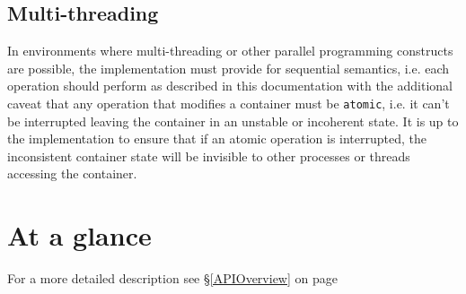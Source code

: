 \documentclass[12pt,a4paper,openany]{memoir} %
\newcommand{\See}[1]{%
see \S\ref{#1} on page~\pageref{#1}
}
\newlength{\yellownotewidth}
\newlength{\yellownoteheight}
\newcommand{\resizeableyellownote}[3]{
\setlength{\yellownotewidth}{#1cm}
\setlength{\yellownoteheight}{#2cm}
\marginpar{
    \vspace{-0.2\yellownoteheight}
        \begin{center}
        \begin{tikzpicture}
            \draw[white,fill=gray!25,opacity=0.75,shift={(-0.125,-0.125)}] 
                (0.0,0.0) rectangle (\yellownotewidth,\yellownoteheight);
            \draw[fill=yellow!35] (0,0.0) rectangle (\yellownotewidth,\yellownoteheight);
            \draw[opacity=0.95,fill=gray!50] (0.5\yellownotewidth,0.9\yellownoteheight) -- 
                (0.7\yellownotewidth,0.45+#2) -- (0.8\yellownotewidth,0.4+#2) -- cycle;
            \node[blue,below] at (0.5\yellownotewidth,0.8\yellownoteheight) {
                \begin{minipage}{\yellownotewidth}
                    \scriptsize#3
                \end{minipage}
            };
        \end{tikzpicture}
        \end{center}
        \vspace{0.5\yellownoteheight}
    }
}
\begin{document}
\subsection{Multi-threading}
In environments where multi-threading or other parallel programming constructs are possible, the implementation must provide for sequential
semantics, i.e. each operation should perform as described in this documentation with the additional caveat that any operation that modifies
a container must be \texttt{atomic}, i.e. it can't be interrupted leaving the container in an unstable or incoherent state. It is up to the
implementation to ensure that if an atomic operation is interrupted, the inconsistent container state will be invisible to other processes
or threads accessing the container.
\section{At a glance}
For a more detailed description \See{APIOverview}
\end{document}
